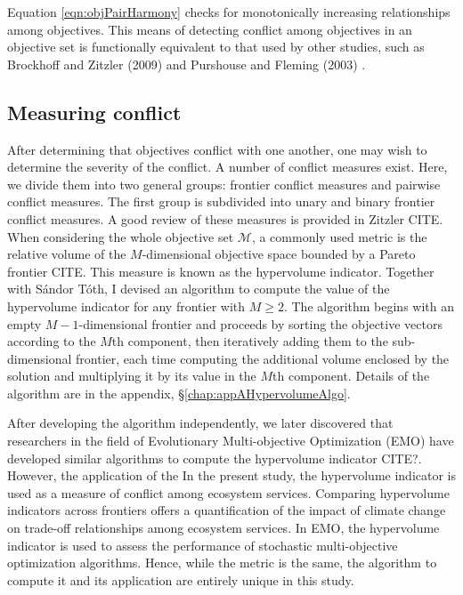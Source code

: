 Equation \eqref{eqn:objPairHarmony} checks for monotonically increasing relationships among objectives. This means of detecting conflict among objectives in an objective set is functionally equivalent to that used by other studies, such as Brockhoff and Zitzler (2009) \cite{brockhoff2009objective} and Purshouse and Fleming (2003) \cite{purshouse2003conflict}.

\subsection{Measuring conflict}
After determining that objectives conflict with one another, one may wish to determine the severity of the conflict. A number of conflict measures exist. Here, we divide them into two general groups: frontier conflict measures and pairwise conflict measures. The first group is subdivided into unary and binary frontier conflict measures. A good review of these measures is provided in Zitzler CITE. When considering the whole objective set $\mathcal{M}$, a commonly used metric is the relative volume of the $M$-dimensional objective space bounded by a Pareto frontier CITE. This measure is known as the hypervolume indicator. Together with S\'{a}ndor T\'{o}th, I devised an algorithm to compute the value of the hypervolume indicator for any frontier with $M \ge 2$. The algorithm begins with an empty $M-1$-dimensional frontier and proceeds by sorting the objective vectors according to the $M$th component, then iteratively adding them to the sub-dimensional frontier, each time computing the additional volume enclosed by the solution and multiplying it by its value in the $M$th component. Details of the algorithm are in the appendix, \S \ref{chap:appAHypervolumeAlgo}.

After developing the algorithm independently, we later discovered that researchers in the field of Evolutionary Multi-objective Optimization (EMO) have developed similar algorithms to compute the hypervolume indicator CITE?. However, the application of the In the present study, the hypervolume indicator is used as a measure of conflict among ecosystem services. Comparing hypervolume indicators across frontiers offers a quantification of the impact of climate change on trade-off relationships among ecosystem services. In EMO, the hypervolume indicator is used to assess the performance of stochastic multi-objective optimization algorithms. Hence, while the metric is the same, the algorithm to compute it and its application are entirely unique in this study.

